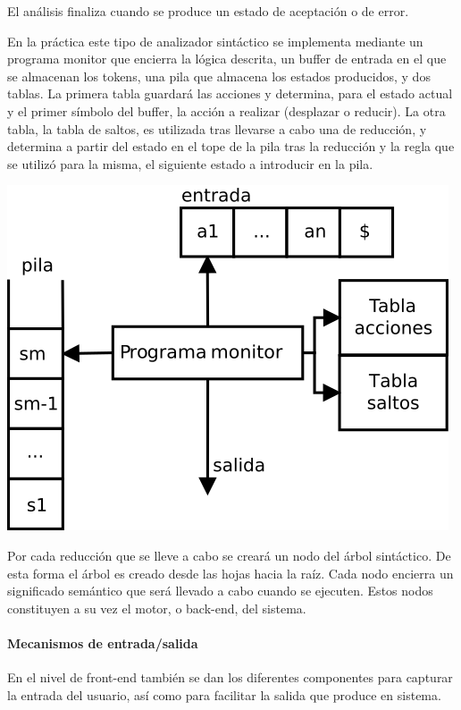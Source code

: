 El análisis finaliza cuando se produce un estado de aceptación o de error. 

En la práctica este tipo de analizador sintáctico se implementa mediante un programa monitor que encierra la lógica descrita, un buffer de entrada en el que se almacenan
los tokens, una pila que almacena los estados producidos, y dos tablas. La primera tabla guardará las acciones y determina, para el estado actual y el primer símbolo del buffer, 
la acción a realizar (desplazar o reducir). La otra tabla, la tabla de saltos, es utilizada tras llevarse a cabo una de reducción, y determina a partir del estado en el tope de la pila
tras la reducción y la regla que se utilizó para la misma, el siguiente estado a introducir en la pila. 

\begin{center}
\includegraphics[scale=0.7]{dia/asd.png} \\
\end{center}

Por cada reducción que se lleve a cabo se creará un nodo del árbol sintáctico. De esta forma el árbol es creado desde las hojas hacia la raíz. Cada nodo encierra un significado semántico que 
será llevado a cabo cuando se ejecuten. Estos nodos constituyen a su vez el motor, o back-end, del sistema.

\paragraph{Mecanismos de entrada/salida}
En el nivel de front-end también se dan los diferentes componentes para capturar la entrada del usuario, así como para facilitar la salida que produce en sistema.

